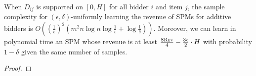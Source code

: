 \begin{lemma}\label{lem:additive srev}
	When $D_{ij}$ is supported on $[0,H]$ for all bidder $i$ and item $j$, the sample complexity for $(\epsilon,\delta)$-uniformly learning the revenue of SPMs for additive bidders is $O\left(\left(\frac{1}{\epsilon}\right)^2 \left(m^2 n\log n\log \frac{1}{\epsilon} + \log \frac{1}{\delta}\right)\right)$. Moreover, we can learn in polynomial time an SPM whose revenue is at least $\frac{\textsc{SRev}}{4}- \frac{3\epsilon}{2}\cdot H$ with probability $1-\delta$ given the same number of samples. \end{lemma}
\begin{proof}


\end{proof}
